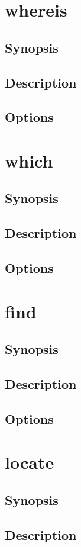 \documentclass[a4paper, 10pt, onecolumn, openright, oneside]{book}
\begin{document}
		\section{whereis}
			\subsection{Synopsis}
			\subsection{Description}
			\subsection{Options}
		\section{which}
			\subsection{Synopsis}
			\subsection{Description}
			\subsection{Options}
		\section{find}
			\subsection{Synopsis}
			\subsection{Description}
			\subsection{Options}
		\section{locate}
			\subsection{Synopsis}
			\subsection{Description}
\end{document}
